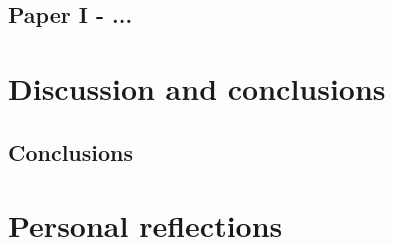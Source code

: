 \documentclass[electronic]{kthesis}
\begin{document}
\section{Paper I - ...}

\chapter{Discussion and conclusions}
\label{Conclusions}
\noindent \lipsum[1]

\section{Conclusions}
\noindent \lipsum[1]

\chapter{Personal reflections}
\label{PersonalReflections}
\noindent \lipsum[1]


\renewcommand{\bibname}{References}%

\end{document}
